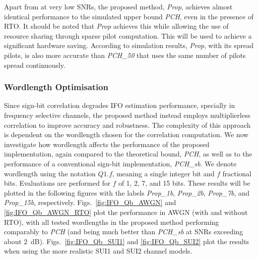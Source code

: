 Apart from at very low SNRs, the proposed method, \emph{Prop}, achieves almost identical performance to the simulated upper bound \emph{PCH}, even in the presence of RTO.
It should be noted that \emph{Prop} achieves this while allowing the use of resource sharing through sparse pilot computation. This will be used to achieve a significant hardware saving.
According to simulation results, \emph{Prop}, with its spread pilots, is also more accurate than \emph{PCH\_50} that uses the same number of pilots spread continuously.

\subsubsection{Wordlength Optimisation}
Since sign-bit correlation degrades IFO estimation performance, specially in frequency selective channels, the proposed method instead employs multiplierless correlation to improve accuracy and robustness.
The complexity of this approach is dependent on the wordlength chosen for the correlation computation.
We now investigate how wordlength affects the performance of the proposed implementation, again compared to the theoretical bound, \emph{PCH}, as well as to the performance of a conventional sign-bit implementation, \emph{PCH\_sb}.
We denote wordlength using the notation $Q1.f$, meaning a single integer bit and $f$ fractional bits.
Evaluations are performed for $f$ of 1, 2, 7, and 15 bits. These results will be plotted in the following figures with the labels \emph{Prop\_1b}, \emph{Prop\_2b}, \emph{Prop\_7b}, and \emph{Prop\_15b}, respectively.
Figs.~\ref{fig:IFO_Qb_AWGN} and \ref{fig:IFO_Qb_AWGN_RTO} plot the performance in AWGN (with and without RTO), with all tested wordlengths in the proposed method performing comparably to \emph{PCH} (and being much better than \emph{PCH\_sb} at SNRs exceeding about 2~dB).
Figs.~\ref{fig:IFO_Qb_SUI1} and \ref{fig:IFO_Qb_SUI2} plot the results when using the more realistic SUI1 and SUI2 channel models.

